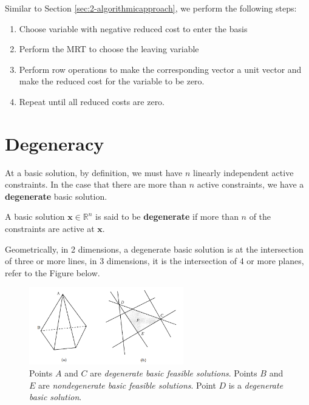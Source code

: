 \documentclass{article}
\begin{document}
\noindent Similar to Section \ref{sec:2-algorithmicapproach}, we perform the following steps: \begin{enumerate}
    \item Choose variable with negative reduced cost to enter the basis
    \item Perform the MRT to choose the leaving variable
    \item Perform row operations to make the corresponding vector a unit vector and make the reduced cost for the variable to be zero. 
    \item Repeat until all reduced costs are zero. 
\end{enumerate}

\section{Degeneracy}

At a basic solution, by definition, we must have $n$ linearly independent active constraints. In the case that there are more than $n$ active constraints, we have a \textbf{degenerate} basic solution. 

\begin{definition}
    A basic solution $\mathbf{x} \in \mathbb{R}^{n}$ is said to be \textbf{degenerate} if more than $n$ of the constraints are active at $\mathbf{x}$. 
\end{definition}

\noindent Geometrically, in 2 dimensions, a degenerate basic solution is at the intersection of three or more lines, in 3 dimensions, it is the intersection of 4 or more planes, refer to the Figure below. 

\begin{figure}[H]
    \centering
    \includegraphics[width=0.6\textwidth]{Images/degeneracy.png}
    \caption{Points $A$ and $C$ are \textit{degenerate basic feasible solutions}. Points $B$ and $E$ are \textit{nondegenerate basic feasible solutions}. Point $D$ is a \textit{degenerate basic solution}.}
    \label{fig:2-degenerate}
\end{figure} 
\end{document}

